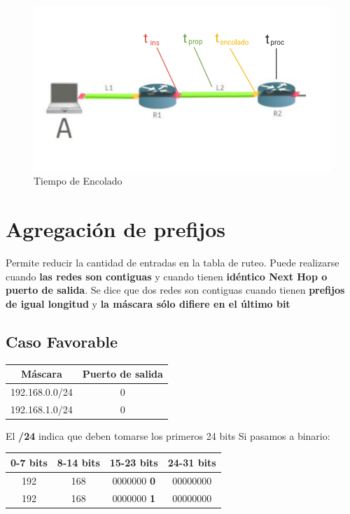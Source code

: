 \documentclass[titlepage,a4paper]{article}
\begin{document}
\begin{figure}[H]
\centering
\includegraphics[width=\textwidth]{imagenes/tiemposRTT.png}
\caption{Tiempo de Encolado}
\end{figure}

\section{Agregación de prefijos}\label{sec:agrprefijos}

Permite reducir la cantidad de entradas en la tabla de ruteo. Puede realizarse cuando \textbf{las redes son contiguas} y cuando tienen \textbf{idéntico Next Hop o puerto de salida}. Se dice que dos redes son contiguas cuando tienen \textbf{prefijos de igual longitud} y \textbf{la máscara sólo difiere en el último bit}


\subsection{Caso Favorable}

\begin{center}
    \begin{tabular}{c|c}
        Máscara & Puerto de salida \\
        \hline
        \hline
         192.168.0.0/24 &  0\\
         \hline
         192.168.1.0/24 &  0
    \end{tabular}
\end{center}

El \textbf{/24} indica que deben tomarse los primeros 24 bits
Si pasamos a binario:

\begin{center}
    \begin{tabular}{c|c|c|c}
        0-7 bits & 8-14 bits & 15-23 bits & 24-31 bits \\
        \hline
        \hline
        192 & 168 & 0000000 \textbf{0} & 00000000 \\
        \hline
        192 & 168 & 0000000 \textbf{1} & 00000000 \\
    \end{tabular}
\end{center}
\end{document}
